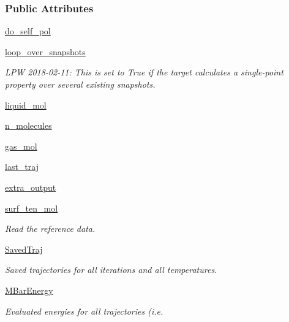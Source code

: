 \subsubsection*{Public Attributes}
\begin{DoxyCompactItemize}
\item 
\hyperlink{classsrc_1_1liquid_1_1Liquid_aa71069dd2ca72eb8f34ec2cd9628cc78}{do\+\_\+self\+\_\+pol}
\item 
\hyperlink{classsrc_1_1liquid_1_1Liquid_a984364c62fcda179ec1352b6849a89bc}{loop\+\_\+over\+\_\+snapshots}
\begin{DoxyCompactList}\small\item\em L\+PW 2018-\/02-\/11\+: This is set to True if the target calculates a single-\/point property over several existing snapshots. \end{DoxyCompactList}\item 
\hyperlink{classsrc_1_1liquid_1_1Liquid_a188bf7be2f84cb659f6e9f47fa7d6dff}{liquid\+\_\+mol}
\item 
\hyperlink{classsrc_1_1liquid_1_1Liquid_a0e3e31fe5612fc358781b86f0a2a2241}{n\+\_\+molecules}
\item 
\hyperlink{classsrc_1_1liquid_1_1Liquid_a42909fcba8430ba70f38a5421b29ab9f}{gas\+\_\+mol}
\item 
\hyperlink{classsrc_1_1liquid_1_1Liquid_a9f6eba84a2ed8a3ce69a1e9c27b98cb0}{last\+\_\+traj}
\item 
\hyperlink{classsrc_1_1liquid_1_1Liquid_aefe3b8e42753ca98c1c2ad1fe567a84e}{extra\+\_\+output}
\item 
\hyperlink{classsrc_1_1liquid_1_1Liquid_a5b6454446d809402102964d8be24a1a5}{surf\+\_\+ten\+\_\+mol}
\begin{DoxyCompactList}\small\item\em Read the reference data. \end{DoxyCompactList}\item 
\hyperlink{classsrc_1_1liquid_1_1Liquid_a258ee224b0bc2345f5a721b01eb329e8}{Saved\+Traj}
\begin{DoxyCompactList}\small\item\em Saved trajectories for all iterations and all temperatures. \end{DoxyCompactList}\item 
\hyperlink{classsrc_1_1liquid_1_1Liquid_aef2366a4e32f76e5c9c2657ee81b8d0c}{M\+Bar\+Energy}
\begin{DoxyCompactList}\small\item\em Evaluated energies for all trajectories (i.\+e. \end{DoxyCompactList}\item 

\end{DoxyCompactItemize}
